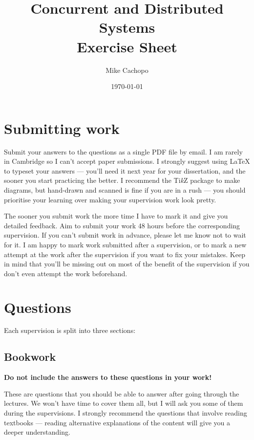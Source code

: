 \documentclass[12pt,a4paper,oneside,openright]{report}
\title{Concurrent and Distributed Systems\\ Exercise Sheet}
\date{\today}
\author{Mike Cachopo}
\begin{document}

\pagestyle{empty}

\maketitle

\newpage

\pagestyle{plain} 

\section*{Submitting work}

Submit your answers to the questions as a single PDF file by email. I
am rarely in Cambridge so I can't accept paper submissions. I strongly
suggest using LaTeX to typeset your answers --- you'll need it next
year for your dissertation, and the sooner you start practicing the
better. I recommend the Ti\textit{k}Z package to make diagrams,
but hand-drawn and scanned is fine if you are in a rush --- you should
prioritise your learning over making your supervision work look
pretty.

The sooner you submit work the more time I have to mark it and give
you detailed feedback. Aim to submit your work 48 hours before the
corresponding supervision. If you can't submit work in advance, please
let me know not to wait for it. I am happy to mark work submitted
after a supervision, or to mark a new attempt at the work after the
supervision if you want to fix your mistakes. Keep in mind that you'll
be missing out on most of the benefit of the supervision if you don't
even attempt the work beforehand.

\section*{Questions}

Each supervision is split into three sections:

\subsection*{Bookwork}

\textbf{Do not include the answers to these questions in your work!}

These are questions that you should be able to answer after going
through the lectures. We won't have time to cover them all, but I will
ask you some of them during the supervisions. I strongly recommend the
questions that involve reading textbooks --- reading alternative
explanations of the content will give you a deeper understanding.
\end{document}
